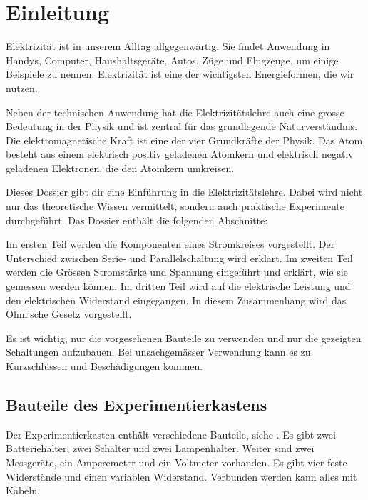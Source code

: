 
\chapter{Einleitung}

Elektrizität ist in unserem Alltag allgegenwärtig. Sie findet Anwendung in Handys,
Computer, Haushaltsgeräte, Autos, Züge und Flugzeuge, um einige Beispiele zu nennen.
Elektrizität ist eine der wichtigsten Energieformen, die wir nutzen.

Neben der technischen Anwendung hat die Elektrizitätslehre auch eine grosse
Bedeutung in der Physik und ist zentral für das grundlegende Naturverständnis.
Die elektromagnetische Kraft ist eine der vier Grundkräfte der Physik.
Das Atom besteht aus einem elektrisch positiv geladenen Atomkern und
elektrisch negativ geladenen Elektronen, die den Atomkern umkreisen.

Dieses Dossier gibt dir eine Einführung in die Elektrizitätslehre.
Dabei wird nicht nur das theoretische Wissen vermittelt, sondern auch
praktische Experimente durchgeführt. Das Dossier enthält die folgenden
Abschnitte:

Im ersten Teil werden die Komponenten eines Stromkreises vorgestellt.
Der Unterschied zwischen Serie- und Parallelschaltung wird erklärt. Im zweiten
Teil werden die Grössen Stromstärke und Spannung eingeführt und erklärt,
wie sie gemessen werden können. Im dritten Teil wird auf die elektrische
Leistung und den elektrischen Widerstand eingegangen. In diesem Zusammenhang
wird das Ohm'sche Gesetz vorgestellt.


\vspace{1cm}

\begin{redbox}
Es ist wichtig, nur die vorgesehenen Bauteile zu verwenden und
nur die gezeigten Schaltungen aufzubauen. Bei unsachgemässer Verwendung
kann es zu Kurzschlüssen und Beschädigungen kommen.
\end{redbox}



\newpage
\section{Bauteile des Experimentierkastens}

Der Experimentierkasten enthält verschiedene Bauteile, siehe
. Es gibt zwei Batteriehalter, zwei Schalter und
zwei Lampenhalter. Weiter sind zwei Messgeräte, ein Amperemeter und ein Voltmeter vorhanden.
Es gibt vier feste Widerstände und einen variablen Widerstand. Verbunden werden kann
alles mit Kabeln.



